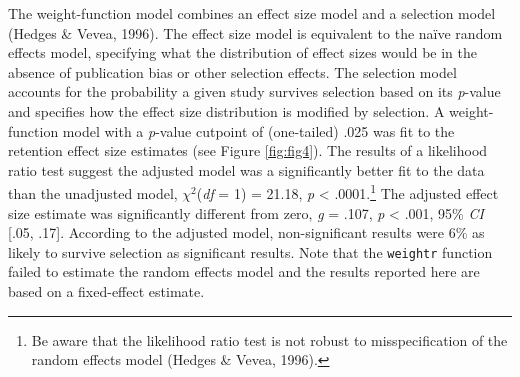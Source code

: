 \documentclass[
  english,
  man, donotrepeattitle,floatsintext]{apa7}
\begin{document}
The weight-function model combines an effect size model and a selection model (Hedges \& Vevea, 1996). The effect size model is equivalent to the naïve random effects model, specifying what the distribution of effect sizes would be in the absence of publication bias or other selection effects. The selection model accounts for the probability a given study survives selection based on its \emph{p}-value and specifies how the effect size distribution is modified by selection. A weight-function model with a \emph{p}-value cutpoint of (one-tailed) .025 was fit to the retention effect size estimates (see Figure \ref{fig:fig4}). The results of a likelihood ratio test suggest the adjusted model was a significantly better fit to the data than the unadjusted model, \(\chi^2\)(\emph{df} = 1) = 21.18, \emph{p} \textless{} .0001.\footnote{Be aware that the likelihood ratio test is not robust to misspecification of the random effects model (Hedges \& Vevea, 1996).} The adjusted effect size estimate was significantly different from zero, \emph{g} = .107, \emph{p} \textless{} .001, 95\% \emph{CI} {[}.05, .17{]}. According to the adjusted model, non-significant results were 6\% as likely to survive selection as significant results. Note that the \texttt{weightr} function failed to estimate the random effects model and the results reported here are based on a fixed-effect estimate.
\end{document}
